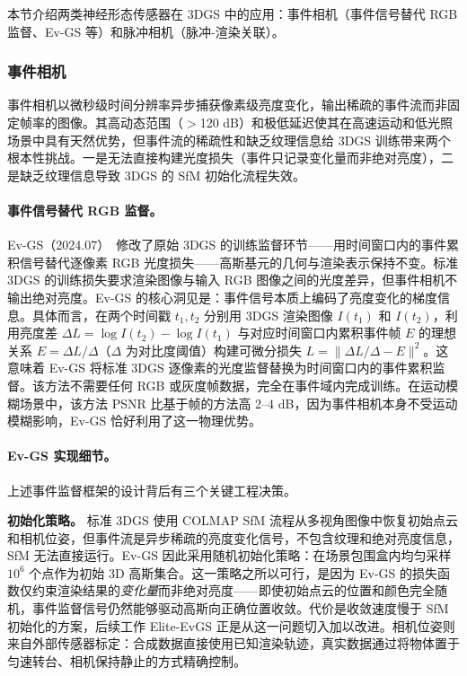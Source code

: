 本节介绍两类神经形态传感器在 3DGS 中的应用：事件相机（事件信号替代 RGB 监督、Ev-GS 等）和脉冲相机（脉冲-渲染关联）。

\subsubsection{事件相机}

事件相机以微秒级时间分辨率异步捕获像素级亮度变化，输出稀疏的事件流而非固定帧率的图像。其高动态范围（$>$120 dB）和极低延迟使其在高速运动和低光照场景中具有天然优势，但事件流的稀疏性和缺乏纹理信息给 3DGS 训练带来两个根本性挑战。一是无法直接构建光度损失（事件只记录变化量而非绝对亮度），二是缺乏纹理信息导致 3DGS 的 SfM 初始化流程失效。

\paragraph{事件信号替代 RGB 监督。} Ev-GS（2024.07）~\cite{2407_11343}修改了原始 3DGS 的训练监督环节——用时间窗口内的事件累积信号替代逐像素 RGB 光度损失——高斯基元的几何与渲染表示保持不变。标准 3DGS 的训练损失要求渲染图像与输入 RGB 图像之间的光度差异，但事件相机不输出绝对亮度。Ev-GS 的核心洞见是：事件信号本质上编码了亮度变化的梯度信息。具体而言，在两个时间戳 $t_1, t_2$ 分别用 3DGS 渲染图像 $I(t_1)$ 和 $I(t_2)$，利用亮度差 $\Delta L = \log I(t_2) - \log I(t_1)$ 与对应时间窗口内累积事件帧 $E$ 的理想关系 $E = \Delta L / \Delta$（$\Delta$ 为对比度阈值）构建可微分损失 $L = \|\Delta L / \Delta - E\|^2$。这意味着 Ev-GS 将标准 3DGS 逐像素的光度监督替换为时间窗口内的事件累积监督。该方法不需要任何 RGB 或灰度帧数据，完全在事件域内完成训练。在运动模糊场景中，该方法 PSNR 比基于帧的方法高 2--4 dB，因为事件相机本身不受运动模糊影响，Ev-GS 恰好利用了这一物理优势。

\paragraph{Ev-GS 实现细节。} 上述事件监督框架的设计背后有三个关键工程决策。

\textbf{初始化策略。} 标准 3DGS 使用 COLMAP SfM 流程从多视角图像中恢复初始点云和相机位姿，但事件流是异步稀疏的亮度变化信号，不包含纹理和绝对亮度信息，SfM 无法直接运行。Ev-GS 因此采用随机初始化策略：在场景包围盒内均匀采样 $10^6$ 个点作为初始 3D 高斯集合。这一策略之所以可行，是因为 Ev-GS 的损失函数仅约束渲染结果的\emph{变化量}而非绝对亮度——即使初始点云的位置和颜色完全随机，事件监督信号仍然能够驱动高斯向正确位置收敛。代价是收敛速度慢于 SfM 初始化的方案，后续工作 Elite-EvGS 正是从这一问题切入加以改进。相机位姿则来自外部传感器标定：合成数据直接使用已知渲染轨迹，真实数据通过将物体置于匀速转台、相机保持静止的方式精确控制。

